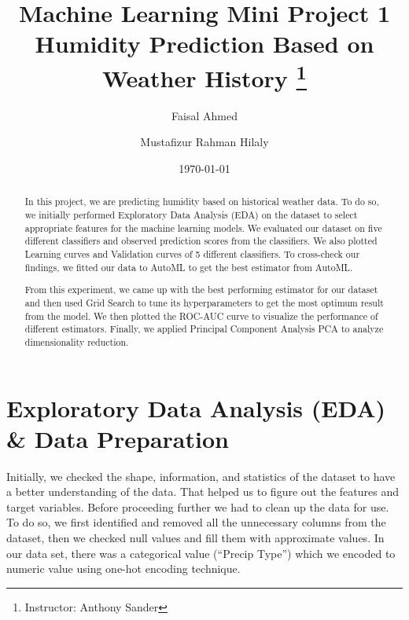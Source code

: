 


\title{
	Machine Learning Mini Project 1 \\
	Humidity Prediction Based on Weather History \thanks{Instructor: Anthony Sander}
}

\author{Faisal Ahmed \and Mustafizur Rahman Hilaly}
\date{\today}



\maketitle
\tableofcontents


\begin{abstract}
In this project, we are predicting humidity based on historical weather data. To do so, we initially performed Exploratory Data Analysis (EDA) on the dataset to select appropriate features for the machine learning models. We evaluated our dataset on five different classifiers and observed prediction scores from the classifiers. We also plotted Learning curves and Validation curves of 5 different classifiers. To cross-check our findings, we fitted our data to AutoML to get the best estimator from AutoML.
	 
From this experiment, we came up with the best performing estimator for our dataset and then used Grid Search to tune its hyperparameters to get the most optimum result from the model. We then plotted the ROC-AUC curve to visualize the performance of different estimators. Finally, we applied Principal Component Analysis PCA to analyze dimensionality reduction.\end{abstract}

\section{Exploratory Data Analysis (EDA) \& Data Preparation}
Initially, we checked the shape, information, and statistics of the dataset to have a better understanding of the data.  That helped us to figure out the features and target variables.  Before proceeding further we had to clean up the data for use. To do so, we first identified and removed all the unnecessary columns from the dataset, then we checked null values and fill them with approximate values.  In our data set, there was a categorical value (“Precip Type”) which we encoded to numeric value using one-hot encoding technique. 

